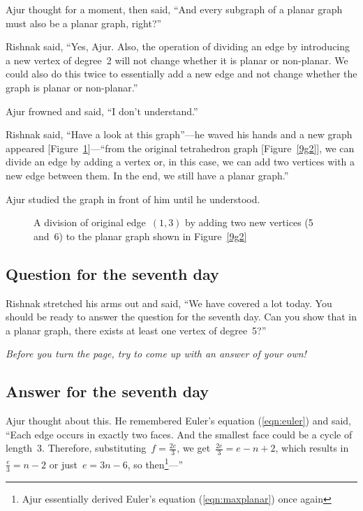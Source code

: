 Ajur thought for a moment, then said, ``And every subgraph of a planar graph must also be a planar graph, right?''

Rishnak said, ``Yes, Ajur. Also, the operation of dividing an edge by introducing a new vertex of degree~2 will not change whether it is planar or non-planar. We could also do this twice to essentially add a new edge and not change whether the graph is planar or non-planar.''

Ajur frowned and said, ``I don't understand.''

Rishnak said, ``Have a look at this graph''---he waved his hands and a new graph appeared [Figure~\ref{9g9}]---``from the original tetrahedron graph [Figure~\ref{9g2}], we can divide an edge by adding a vertex or, in this case, we can add two vertices with a new edge between them. In the end, we still have a planar graph.''

Ajur studied the graph in front of him until he understood.

\begin{figure}[h]
\begin{center}
\caption{A division of original edge~$(1,3)$ by adding two new vertices (5 and~6) to the planar graph shown in Figure~\ref{9g2}}\label{9g9}
\end{center}
\end{figure}

\newpage
\subsection*{Question for the seventh day}
Rishnak stretched his arms out and said, ``We have covered a lot today. You should be ready to answer the question for the seventh day. Can you show that in a planar graph, there exists at least one vertex of degree~5?''

\textit{Before you turn the page, try to come up with an answer of your own!}

\newpage
\subsection*{Answer for the seventh day}
Ajur thought about this. He remembered Euler's equation (\ref{eqn:euler}) and said, ``Each edge occurs in exactly two faces. And the smallest face could be a cycle of length~3. Therefore, substituting~$f=\frac{2e}{3}$, we get~$\frac{2e}{3}=e-n+2$, which results in~$\frac{e}{3}=n-2$ or just~$e=3n-6$, so then\footnote{Ajur essentially derived Euler's equation (\ref{eqn:maxplanar}) once again}---''

